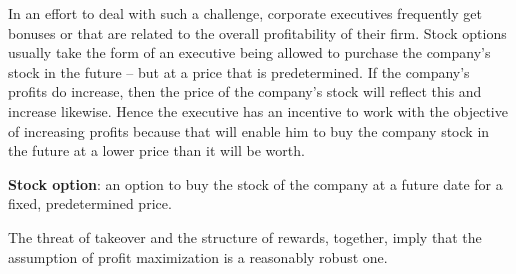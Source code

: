 In an effort to deal with such a challenge, corporate executives frequently get bonuses or  that are related to the overall profitability of their firm. Stock options usually take the form of an executive being allowed to purchase the company's stock in the future -- but at a price that is predetermined. If the company's profits do increase, then the price of the company's stock will reflect this and increase likewise. Hence the executive has an incentive to work with the objective of increasing profits because that will enable him to buy the company stock in the future at a lower price than it will be worth.

\begin{DefBox}
\textbf{Stock option}: an option to buy the stock of the company at a future date for a fixed, predetermined price.
\end{DefBox}

The threat of takeover and the structure of rewards, together, imply that the assumption of profit maximization is a reasonably robust one.